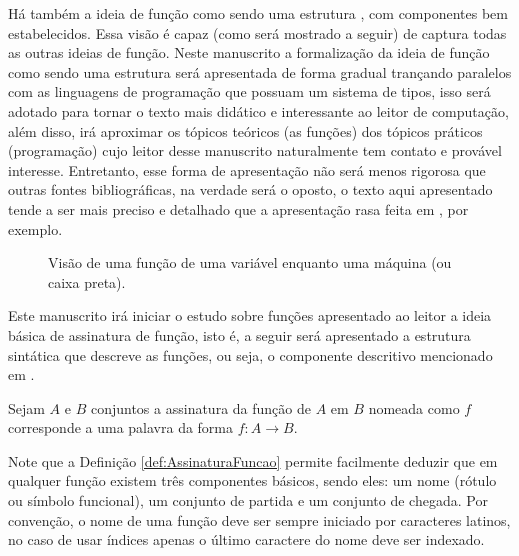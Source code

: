 Há também a ideia de função como sendo uma estrutura \cite{judith2021}, com componentes bem estabelecidos. Essa visão é capaz (como será mostrado a seguir) de captura todas as outras ideias de função.  Neste manuscrito a formalização da ideia de função como sendo uma estrutura será apresentada de forma gradual trançando paralelos com as linguagens de programação que possuam um sistema de tipos, isso será adotado para tornar o texto mais didático e interessante ao leitor de computação, além disso, irá aproximar os tópicos teóricos (as funções) dos tópicos práticos (programação) cujo leitor desse manuscrito naturalmente tem contato e provável interesse. Entretanto, esse forma de apresentação não será menos rigorosa que outras fontes bibliográficas, na verdade será o oposto, o texto aqui apresentado tende a ser mais preciso e detalhado que a apresentação rasa feita em \cite{judith2021}, por exemplo.

\begin{figure}[h]
	\centering
	\caption{Visão de uma função de uma variável enquanto uma máquina (ou caixa preta).}
	\label{fig:FuncaoBlackBox}
\end{figure}

Este manuscrito irá iniciar o estudo sobre funções  apresentado ao leitor a ideia básica de assinatura de função, isto é, a seguir será apresentado a estrutura sintática que descreve as funções, ou seja, o componente descritivo mencionado em \cite{levin2021}.

\begin{definition}\label{def:AssinaturaFuncao}
	Sejam $A$ e $B$ conjuntos a assinatura da função de $A$ em $B$ nomeada como $f$ corresponde a uma palavra da forma $f: A \rightarrow B$.
\end{definition}

Note que a Definição \ref{def:AssinaturaFuncao} permite facilmente deduzir que em qualquer função existem três componentes básicos, sendo eles: um nome (rótulo ou símbolo funcional), um conjunto de partida e um conjunto de chegada. Por convenção, o nome de uma função deve ser sempre iniciado por caracteres latinos, no caso de usar índices apenas o último caractere do nome deve ser indexado.

